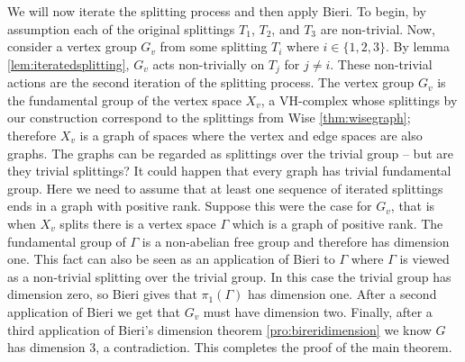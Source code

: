 \documentclass[12pt,parskip=full]{report}
\theoremstyle{plain}
\theoremstyle{definition}
\begin{document}
We will now iterate the splitting process and then apply Bieri. To begin, by assumption each of the original splittings \(T_1\), \(T_2\), and \(T_3\) are non-trivial. Now, consider a vertex group \(G_v\) from some splitting \(T_i\) where \(i\in \{1,2,3\}\). By lemma \ref{lem:iteratedsplitting}, \(G_v\) acts non-trivially on \(T_j\) for \(j\neq i\). These non-trivial actions are the second iteration of the splitting process. The vertex group \(G_v\) is the fundamental group of  the vertex space \(X_v\), a VH-complex whose splittings by our construction correspond to the splittings from Wise \ref{thm:wisegraph}; therefore \(X_v\) is a graph of spaces where the vertex and edge spaces are also graphs. The graphs can be regarded as splittings over the trivial group -- but are they trivial splittings? It could happen that every graph has trivial fundamental group. Here we need to assume that at least one sequence of iterated splittings ends in a graph with positive rank. Suppose this were the case for \(G_v\), that is when \(X_v\) splits there is a vertex space \(\Gamma\) which is a graph of positive rank. The fundamental group of \(\Gamma\) is a non-abelian free group and therefore has dimension one. This fact can also be seen as an application of Bieri to \(\Gamma\) where \(\Gamma\) is viewed as a non-trivial splitting over the trivial group. In this case the trivial group has dimension zero, so Bieri gives that \(\pi_1(\Gamma)\) has dimension one. After a second application of Bieri we get that \(G_v\) must have dimension two. Finally, after a third application of Bieri's dimension theorem \ref{pro:bireridimension} we know \(G\) has dimension 3, a contradiction. This completes the proof of the main theorem.



\noindent

\cleardoublepage






\end{document}
